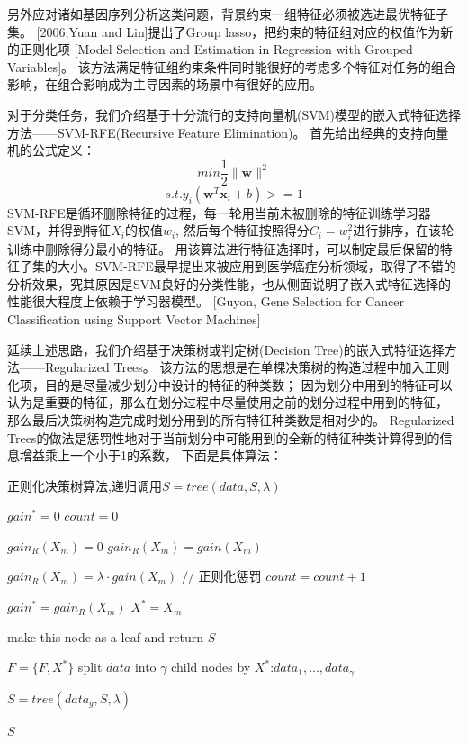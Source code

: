 \documentclass[a4paper,UTF8]{article}
\begin{document}
另外应对诸如基因序列分析这类问题，背景约束一组特征必须被选进最优特征子集。
[2006,Yuan and Lin]提出了Group lasso，把约束的特征组对应的权值作为新的正则化项
[Model Selection and Estimation in Regression with Grouped Variables]。
该方法满足特征组约束条件同时能很好的考虑多个特征对任务的组合影响，在组合影响成为主导因素的场景中有很好的应用。


对于分类任务，我们介绍基于十分流行的支持向量机(SVM)模型的嵌入式特征选择方法——SVM-RFE(Recursive Feature Elimination)。
首先给出经典的支持向量机的公式定义：
$$ min \frac{1}{2}\parallel \textbf{w} \parallel^{2} $$
$$ s.t. y_{i}(\textbf{w}^{T}\textbf{x}_{i}+b)>=1 $$
SVM-RFE是循环删除特征的过程，每一轮用当前未被删除的特征训练学习器SVM，并得到特征$X_{i}$的权值$w_{i}$,
然后每个特征按照得分$C_{i}=w_{i}^{2}$进行排序，在该轮训练中删除得分最小的特征。
用该算法进行特征选择时，可以制定最后保留的特征子集的大小。SVM-RFE最早提出来被应用到医学癌症分析领域，取得了不错的
分析效果，究其原因是SVM良好的分类性能，也从侧面说明了嵌入式特征选择的性能很大程度上依赖于学习器模型。
[Guyon, Gene Selection for Cancer Classification using Support Vector Machines]


延续上述思路，我们介绍基于决策树或判定树(Decision Tree)的嵌入式特征选择方法——Regularized Trees。
该方法的思想是在单棵决策树的构造过程中加入正则化项，目的是尽量减少划分中设计的特征的种类数；
因为划分中用到的特征可以认为是重要的特征，那么在划分过程中尽量使用之前的划分过程中用到的特征，
那么最后决策树构造完成时划分用到的所有特征种类数是相对少的。
Regularized Trees的做法是惩罚性地对于当前划分中可能用到的全新的特征种类计算得到的信息增益乘上一个小于1的系数，
下面是具体算法：

\begin{algorithm}
  \caption{正则化决策树算法,递归调用$S=tree(data,S,\lambda)$}
  \begin{algorithmic}[1]

    \STATE $gain^{*}=0$
    \STATE $count=0$

      \STATE $gain_{R}(X_{m})=0$
        \STATE $gain_{R}(X_{m})=gain(X_{m})$
      \ENDIF

        \STATE $gain_{R}(X_{m})=\lambda \cdot gain(X_{m})$ $//$ 正则化惩罚
        \STATE $count=count+1$
      \ENDIF

        \STATE $gain^{*}=gain_{R}(X_{m})$
        \STATE $X^{*}=X_{m}$
      \ENDIF

    \ENDFOR

      \STATE make this node as a leaf and return $S$
    \ENDIF

      \STATE $F=\{F,X^{*}\}$
    \ENDIF
    \STATE split $data$ into $\gamma$ child nodes by $X^{*}$:$data_{1},...,data_{\gamma}$

      \STATE $S=tree(data_{g},S,\lambda)$
    \ENDFOR

    \RETURN $S$
  \end{algorithmic}

\end{algorithm}
\end{document}
